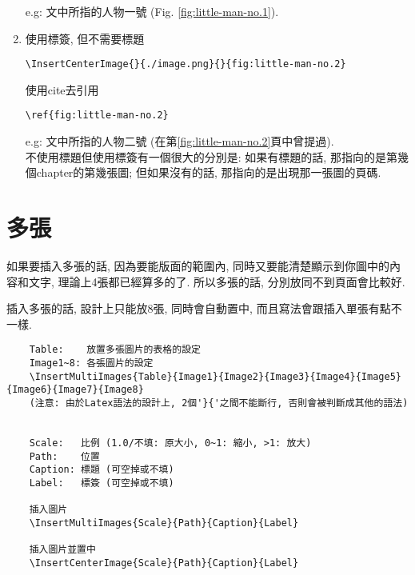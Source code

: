\begin{enumerate}
{      e.g: 文中所指的人物一號 (Fig. \ref{fig:little-man-no.1}).
    } %

    \newpage

    \item
    {
      使用標簽, 但不需要標題\begin{verbatim}\InsertCenterImage{}{./image.png}{}{fig:little-man-no.2}\end{verbatim}
      使用cite去引用\begin{verbatim}\ref{fig:little-man-no.2}\end{verbatim}

      e.g: 文中所指的人物二號 (在第\ref{fig:little-man-no.2}頁中曾提過). \\

      不使用標題但使用標簽有一個很大的分別是: 如果有標題的話, 那指向的是第幾個chapter的第幾張圖; 但如果沒有的話, 那指向的是出現那一張圖的頁碼.
    } %
  \end{enumerate}

\newpage
\section{多張}

  如果要插入多張的話, 因為要能版面的範圍內, 同時又要能清楚顯示到你圖中的內容和文字, 理論上4張都已經算多的了. 所以多張的話, 分別放同不到頁面會比較好.

  插入多張的話, 設計上只能放8張, 同時會自動置中, 而且寫法會跟插入單張有點不一樣.

  \begin{framed}
  \begin{verbatim}
    Table:    放置多張圖片的表格的設定
    Image1~8: 各張圖片的設定
    \InsertMultiImages{Table}{Image1}{Image2}{Image3}{Image4}{Image5}{Image6}{Image7}{Image8}
    (注意: 由於Latex語法的設計上, 2個'}{'之間不能斷行, 否則會被判斷成其他的語法)


    Scale:   比例 (1.0/不填: 原大小, 0~1: 縮小, >1: 放大)
    Path:    位置
    Caption: 標題 (可空掉或不填)
    Label:   標簽 (可空掉或不填)

    插入圖片
    \InsertMultiImages{Scale}{Path}{Caption}{Label}

    插入圖片並置中
    \InsertCenterImage{Scale}{Path}{Caption}{Label}
  \end{verbatim}
  \end{framed}

